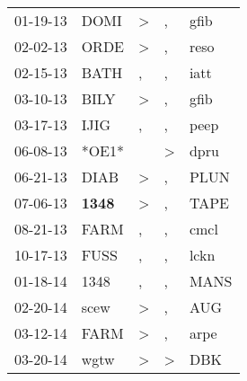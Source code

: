 \begin{supertabular}{p{0.07\textwidth}p{0.06\textwidth}p{0.02\textwidth}p{0.02\textwidth}p{0.06\textwidth}}
          01-19-13\textsuperscript{} &           DOMI\textsuperscript{} &     \textgreater &                , &           gfib\textsuperscript{} \\
          02-02-13\textsuperscript{} &           ORDE\textsuperscript{} &     \textgreater &                , &           reso\textsuperscript{} \\
          02-15-13\textsuperscript{} &           BATH\textsuperscript{} &                , &                , &           iatt\textsuperscript{} \\
          03-10-13\textsuperscript{} &           BILY\textsuperscript{} &     \textgreater &                , &           gfib\textsuperscript{} \\
          03-17-13\textsuperscript{} &           IJIG\textsuperscript{} &                , &                , &           peep\textsuperscript{} \\
          06-08-13\textsuperscript{} &                            *OE1* &                  &     \textgreater &           dpru\textsuperscript{} \\
          06-21-13\textsuperscript{} &           DIAB\textsuperscript{} &     \textgreater &                , &           PLUN\textsuperscript{} \\
          07-06-13\textsuperscript{} &  \textbf{1348\textsuperscript{}} &     \textgreater &                , &           TAPE\textsuperscript{} \\
          08-21-13\textsuperscript{} &           FARM\textsuperscript{} &                , &                , &           cmcl\textsuperscript{} \\
          10-17-13\textsuperscript{} &           FUSS\textsuperscript{} &                , &                , &           lckn\textsuperscript{} \\
          01-18-14\textsuperscript{} &           1348\textsuperscript{} &                , &                , &           MANS\textsuperscript{} \\
          02-20-14\textsuperscript{} &           scew\textsuperscript{} &     \textgreater &                , &            AUG\textsuperscript{} \\
          03-12-14\textsuperscript{} &           FARM\textsuperscript{} &     \textgreater &                , &           arpe\textsuperscript{} \\
          03-20-14\textsuperscript{} &           wgtw\textsuperscript{} &     \textgreater &     \textgreater &            DBK\textsuperscript{} \\

\end{supertabular}
